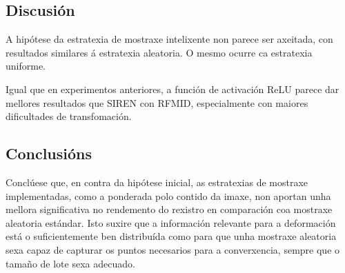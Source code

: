 





\subsection{Discusión}
\label{subsec:Discusion-sampling}

A hipótese da estratexia de mostraxe intelixente non parece ser axeitada, con resultados similares á estratexia aleatoria. 
O mesmo ocurre ca estratexia uniforme.

Igual que en experimentos anteriores, a función de activación ReLU parece dar mellores resultados que SIREN con RFMID, especialmente con maiores dificultades de transfomación.


\subsection{Conclusións}
\label{subsec:Conclusions-sampling}
Conclúese que, en contra da hipótese inicial, as estratexias de mostraxe implementadas, como a ponderada polo contido da imaxe, non aportan unha mellora significativa no rendemento do rexistro en comparación coa mostraxe aleatoria estándar. Isto suxire que a información relevante para a deformación está o suficientemente ben distribuída como para que unha mostraxe aleatoria sexa capaz de capturar os puntos necesarios para a converxencia, sempre que o tamaño de lote sexa adecuado.


